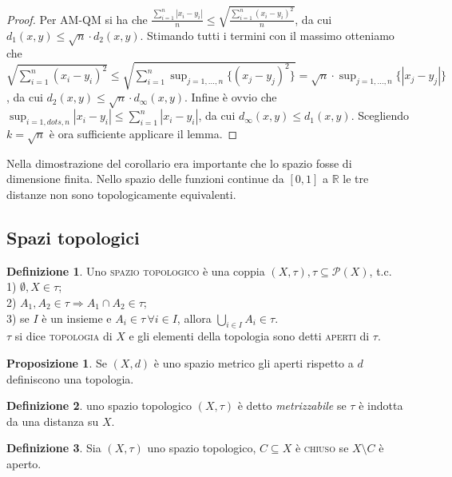 \documentclass{article}
\theoremstyle{definition}
\newtheorem*{defn}{Definizione}
\newtheorem*{prop}{Proposizione}
\begin{document}
	\begin{proof}
		Per AM-QM si ha che $\displaystyle \frac{\sum_{i=1}^n |x_i-y_i|}{n} \le \sqrt{\frac{\sum_{i=1}^n (x_i-y_i)^2}{n}}$, da cui $d_1(x, y) \le \sqrt{n} \cdot d_2(x, y)$. Stimando tutti i termini con il massimo otteniamo che $\displaystyle \sqrt{\sum_{i=1}^n (x_i-y_i)^2} \le \sqrt{\sum_{i=1}^n \sup_{j=1, \dots, n} \{(x_j-y_j)^2\}}=\sqrt{n} \cdot \sup_{j=1, \dots, n} \{ |x_j-y_j| \}$, da cui $d_2(x, y) \le \sqrt{n} \cdot d_{\infty} (x, y)$. Infine è ovvio che $\displaystyle \sup_{i=1, dots, n} |x_i-y_i| \le \sum_{i=1}^n |x_i-y_i|$, da cui $d_{\infty}(x, y) \le d_1(x, y)$. Scegliendo $k=\sqrt{n}$ è ora sufficiente applicare il lemma.
	\end{proof}
	
	Nella dimostrazione del corollario era importante che lo spazio fosse di dimensione finita. Nello spazio delle funzioni continue da $[0, 1]$ a $\mathbb{R}$ le tre distanze non sono topologicamente equivalenti.
	
	\subsection{Spazi topologici}
	
	\begin{defn}
		Uno \textsc{spazio topologico} è una coppia $(X, \tau), \tau \subseteq \mathcal{P}(X)$, t.c. \\
		1) $\emptyset, X \in \tau$; \\
		2) $A_1, A_2 \in \tau \Rightarrow A_1 \cap A_2 \in \tau$; \\
		3) se $I$ è un insieme e $A_i \in \tau \, \forall i \in I$, allora $\displaystyle \bigcup_{i \in I} A_i \in \tau$. \\
		$\tau$ si dice \textsc{topologia} di $X$ e gli elementi della topologia sono detti \textsc{aperti} di $\tau$.
	\end{defn}
	
	\begin{prop}
		Se $(X, d)$ è uno spazio metrico gli aperti rispetto a $d$ definiscono una topologia.
	\end{prop}
	
	\begin{defn}
		uno spazio topologico $(X, \tau)$ è detto \textit{metrizzabile} se $\tau$ è indotta da una distanza su $X$.
	\end{defn}
	
	\begin{defn}
		Sia $(X, \tau)$ uno spazio topologico, $C \subseteq X$ è \textsc{chiuso} se $X \setminus C$ è aperto.
	\end{defn}
	
\end{document}
